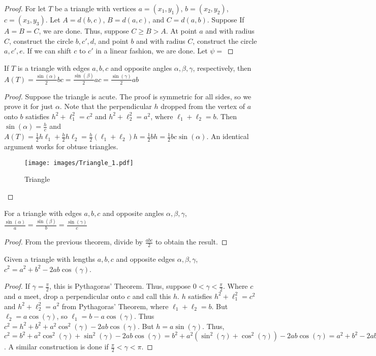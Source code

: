         \begin{proof}
        For let $T$ be a triangle with vertices $a=(x_1,y_1)$, $b=(x_2,y_2)$, $c=(x_3,y_3)$. Let $A = d(b,c)$, $B=d(a,c)$, and $C=d(a,b)$. Suppose If $A=B=C$, we are done. Thus, suppose $C\geq B >A$. At point $a$ and with radius $C$, construct the circle $b,c',d$, and point $b$ and with radius $C$, construct the circle $a,c',e$. If we can shift $c$ to $c'$ in a linear fashion, we are done. Let $\psi =$
        \end{proof}
        \begin{theorem}
        If $T$ is a triangle with edges $a,b,c$ and opposite angles $\alpha,\beta,\gamma$, respectively, then $A(T) = \frac{\sin(\alpha)}{2}bc = \frac{\sin(\beta)}{2}ac = \frac{\sin(\gamma)}{2}ab$
        \end{theorem}
        \begin{proof}
        Suppose the triangle is acute. The proof is symmetric for all sides, so
        we prove it for just $\alpha$. Note that the perpendicular $h$ dropped
        from the vertex of $a$ onto $b$ satisfies $h^2+\ell_1^2 = c^2$ and
        $h^2+\ell_2^2 = a^2$, where $\ell_1+\ell_2 = b$. Then
        $\sin(\alpha) = \frac{h}{c}$ and
        $A(T) = \frac{1}{2}h\ell_1 + \frac{h}{2}h\ell_2 = \frac{h}{2}(\ell_1+\ell_2)h = \frac{1}{2}bh = \frac{1}{2}bc\sin(\alpha)$.
        An identical argument works for obtuse triangles.
        \begin{figure}[H]
            \centering
            \captionsetup{type=figure}
            \texttt{[image: images/Triangle\_1.pdf]}
            \caption{Triangle}
        \end{figure}
        \end{proof}
        \begin{theorem}
        For a triangle with edges $a,b,c$ and opposite angles $\alpha,\beta,\gamma$, $\frac{\sin(\alpha)}{a} = \frac{\sin(\beta)}{b} = \frac{\sin(\gamma)}{c}$
        \end{theorem}
        \begin{proof}
        From the previous theorem, divide by $\frac{abc}{2}$ to obtain the result.
        \end{proof}
        \begin{theorem}
        Given a triangle with lengths $a,b,c$ and opposite edges $\alpha,\beta,\gamma$, $c^2=a^2+b^2-2ab\cos(\gamma)$.
        \end{theorem}
        \begin{proof}
        If $\gamma=\frac{\pi}{2}$, this is Pythagoras' Theorem. Thus, suppose $0<\gamma < \frac{\pi}{2}$. Where $c$ and $a$ meet, drop a perpendicular onto $c$ and call this $h$. $h$ satisfies $h^2+\ell_1^2 = c^2$ and $h^2+\ell_2^2=a^2$ from Pythagoras' Theorem, where $\ell_1+\ell_2 = b$. But $\ell_2 = a\cos(\gamma)$, so $\ell_1 = b-a\cos(\gamma)$. Thus $c^2 = h^2 + b^2 +a^2\cos^2(\gamma)-2ab\cos(\gamma)$. But $h = a\sin(\gamma)$. Thus, $c^2 = b^2 + a^2 \cos^2(\gamma)+\sin^2(\gamma)-2ab\cos(\gamma) = b^2 + a^2(\sin^2(\gamma)+\cos^2(\gamma))-2ab\cos(\gamma) = a^2 + b^2 -2ab\cos(\gamma)$. A similar construction is done if $\frac{\pi}{2}<\gamma < \pi$.
        \end{proof}
